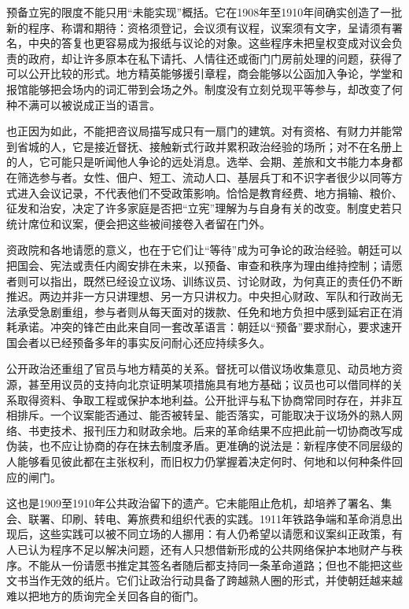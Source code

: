 预备立宪的限度不能只用“未能实现”概括。它在1908年至1910年间确实创造了一批新的程序、称谓和期待：资格须登记，会议须有议程，议案须有文字，呈请须有署名，中央的答复也更容易成为报纸与议论的对象。这些程序未把皇权变成对议会负责的政府，却让许多原本在私下请托、人情往还或衙门门房前处理的问题，获得了可以公开比较的形式。地方精英能够援引章程，商会能够以公函加入争论，学堂和报馆能够把会场内的词汇带到会场之外。制度没有立刻兑现平等参与，却改变了何种不满可以被说成正当的语言。

也正因为如此，不能把咨议局描写成只有一扇门的建筑。对有资格、有财力并能常到省城的人，它是接近督抚、接触新式行政并累积政治经验的场所；对不在名册上的人，它可能只是听闻他人争论的远处消息。选举、会期、差旅和文书能力本身都在筛选参与者。女性、佃户、短工、流动人口、基层兵丁和不识字者很少以同等方式进入会议记录，不代表他们不受政策影响。恰恰是教育经费、地方捐输、粮价、征发和治安，决定了许多家庭是否把“立宪”理解为与自身有关的改变。制度史若只统计席位和议案，便会把这些被间接卷入者留在门外。

资政院和各地请愿的意义，也在于它们让“等待”成为可争论的政治经验。朝廷可以把国会、宪法或责任内阁安排在未来，以预备、审查和秩序为理由维持控制；请愿者则可以指出，既然已经设立议场、训练议员、讨论财政，为何真正的责任仍不断推迟。两边并非一方只讲理想、另一方只讲权力。中央担心财政、军队和行政尚无法承受急剧重组，参与者则从每天面对的拨款、任免和地方负担中感到延宕正在消耗承诺。冲突的锋芒由此来自同一套改革语言：朝廷以“预备”要求耐心，要求速开国会者以已经预备多年的事实反问耐心还应持续多久。

公开政治还重组了官员与地方精英的关系。督抚可以借议场收集意见、动员地方资源，甚至用议员的支持向北京证明某项措施具有地方基础；议员也可以借同样的关系取得资料、争取工程或保护本地利益。公开批评与私下协商常同时存在，并非互相排斥。一个议案能否通过、能否被转呈、能否落实，可能取决于议场外的熟人网络、书吏技术、报刊压力和财政余地。后来的革命结果不应把此前一切协商改写成伪装，也不应让协商的存在抹去制度矛盾。更准确的说法是：新程序使不同层级的人能够看见彼此都在主张权利，而旧权力仍掌握着决定何时、何地和以何种条件回应的闸门。

这也是1909至1910年公共政治留下的遗产。它未能阻止危机，却培养了署名、集会、联署、印刷、转电、筹旅费和组织代表的实践。1911年铁路争端和革命消息出现后，这些实践可以被不同立场的人挪用：有人仍希望以请愿和议案纠正政策，有人已认为程序不足以解决问题，还有人只想借新形成的公共网络保护本地财产与秩序。不能从一份请愿书推定其签名者随后都支持同一条革命道路；但也不能把这些文书当作无效的纸片。它们让政治行动具备了跨越熟人圈的形式，并使朝廷越来越难以把地方的质询完全关回各自的衙门。

